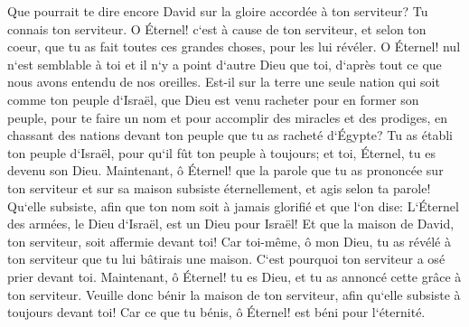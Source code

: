 \verse Que pourrait te dire encore David sur la gloire accordée à ton serviteur? Tu connais ton serviteur. 
\verse O Éternel! c`est à cause de ton serviteur, et selon ton coeur, que tu as fait toutes ces grandes choses, pour les lui révéler. 
\verse O Éternel! nul n`est semblable à toi et il n`y a point d`autre Dieu que toi, d`après tout ce que nous avons entendu de nos oreilles. 
\verse Est-il sur la terre une seule nation qui soit comme ton peuple d`Israël, que Dieu est venu racheter pour en former son peuple, pour te faire un nom et pour accomplir des miracles et des prodiges, en chassant des nations devant ton peuple que tu as racheté d`Égypte? 
\verse Tu as établi ton peuple d`Israël, pour qu`il fût ton peuple à toujours; et toi, Éternel, tu es devenu son Dieu. 
\verse Maintenant, ô Éternel! que la parole que tu as prononcée sur ton serviteur et sur sa maison subsiste éternellement, et agis selon ta parole! 
\verse Qu`elle subsiste, afin que ton nom soit à jamais glorifié et que l`on dise: L`Éternel des armées, le Dieu d`Israël, est un Dieu pour Israël! Et que la maison de David, ton serviteur, soit affermie devant toi! 
\verse Car toi-même, ô mon Dieu, tu as révélé à ton serviteur que tu lui bâtirais une maison. C`est pourquoi ton serviteur a osé prier devant toi. 
\verse Maintenant, ô Éternel! tu es Dieu, et tu as annoncé cette grâce à ton serviteur. 
\verse Veuille donc bénir la maison de ton serviteur, afin qu`elle subsiste à toujours devant toi! Car ce que tu bénis, ô Éternel! est béni pour l`éternité. 

\chapter{}

